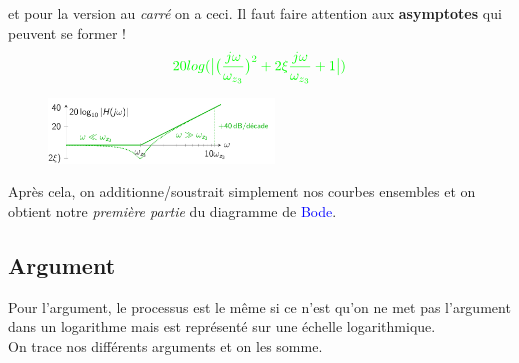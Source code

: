 \documentclass{report}
\begin{document}
et pour la version au \textit{carré} on a ceci. Il faut faire attention aux \textbf{asymptotes} qui peuvent se former !
\begin{align*}
\textcolor{green}{20log(\bigr|  \bigr(\frac{j\omega}{\omega_{z_3}}\bigr)^2 + 2 \xi \frac{j\omega}{\omega_{z_3}} +1 \bigr|)}
\end{align*}
\begin{figure}[H]
\centering
\includegraphics[width=6cm]{img/jomegamax.png}
\end{figure}
Après cela, on additionne/soustrait simplement nos courbes ensembles et on obtient notre \textit{première partie} du diagramme de \textcolor{blue}{Bode}.

\subsection{Argument}
Pour l'argument, le processus est le même si ce n'est qu'on ne met pas l'argument dans un logarithme mais est représenté sur une échelle logarithmique.\\
On trace nos différents arguments et on les somme.
\end{document}
